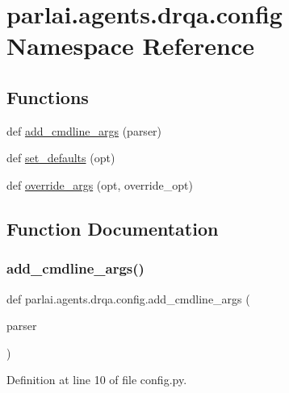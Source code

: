 \hypertarget{namespaceparlai_1_1agents_1_1drqa_1_1config}{}\section{parlai.\+agents.\+drqa.\+config Namespace Reference}
\label{namespaceparlai_1_1agents_1_1drqa_1_1config}
\subsection*{Functions}
\begin{DoxyCompactItemize}
\item 
def \hyperlink{namespaceparlai_1_1agents_1_1drqa_1_1config_a62fdd5554f1da6be0cba185271058320}{add\+\_\+cmdline\+\_\+args} (parser)
\item 
def \hyperlink{namespaceparlai_1_1agents_1_1drqa_1_1config_a8cc825bafeff299794cba6e2a8b65da2}{set\+\_\+defaults} (opt)
\item 
def \hyperlink{namespaceparlai_1_1agents_1_1drqa_1_1config_a0fd9c7cd1129e5b4a7c0315b9f03c31a}{override\+\_\+args} (opt, override\+\_\+opt)
\end{DoxyCompactItemize}


\subsection{Function Documentation}
\mbox{\label{namespaceparlai_1_1agents_1_1drqa_1_1config_a62fdd5554f1da6be0cba185271058320}} 
\subsubsection{\texorpdfstring{add\+\_\+cmdline\+\_\+args()}{add\_cmdline\_args()}}
{\footnotesize\ttfamily def parlai.\+agents.\+drqa.\+config.\+add\+\_\+cmdline\+\_\+args (\begin{DoxyParamCaption}\item[{}]{parser }\end{DoxyParamCaption})}



Definition at line 10 of file config.\+py.



